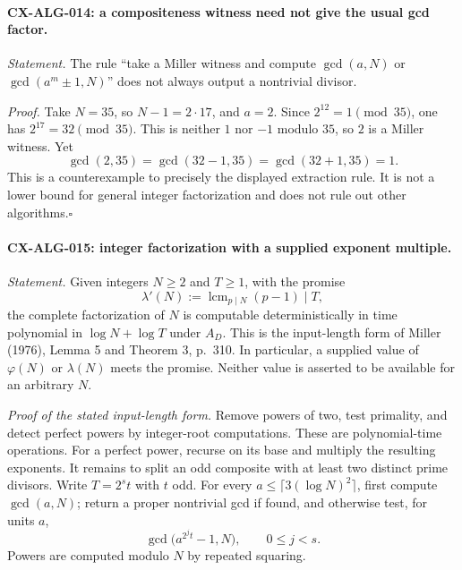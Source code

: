 \documentclass[11pt,a4paper]{article}
\begin{document}
\paragraph{CX-ALG-014: a compositeness witness need not give the usual gcd factor.}
\emph{Statement.} The rule ``take a Miller witness and compute
$\gcd(a,N)$ or $\gcd(a^m\pm1,N)$'' does not always output a nontrivial divisor.

\emph{Proof.} Take $N=35$, so $N-1=2\cdot17$, and $a=2$. Since
$2^{12}=1\pmod{35}$, one has $2^{17}=32\pmod{35}$. This is neither $1$ nor
$-1$ modulo $35$, so $2$ is a Miller witness. Yet
\[
 \gcd(2,35)=\gcd(32-1,35)=\gcd(32+1,35)=1.
\]
This is a counterexample to precisely the displayed extraction rule.
It is not a lower bound for general integer factorization and does not
rule out other algorithms.\hfill$\square$

\paragraph{CX-ALG-015: integer factorization with a supplied exponent multiple.}
\emph{Statement.} Given integers $N\ge2$ and $T\ge1$, with the promise
\[
       \lambda'(N):=\operatorname{lcm}_{p\mid N}(p-1)\mid T,
\]
the complete factorization of $N$ is computable deterministically in time
polynomial in $\log N+\log T$ under $A_D$. This is the input-length form
of Miller (1976), Lemma 5 and Theorem 3, p.~310. In particular, a supplied
value of $\varphi(N)$ or $\lambda(N)$ meets the promise. Neither value is
asserted to be available for an arbitrary $N$.

\emph{Proof of the stated input-length form.} Remove powers of two, test
primality, and detect perfect powers by integer-root computations. These
are polynomial-time operations. For a perfect power, recurse on its base
and multiply the resulting exponents. It remains to split an odd composite
with at least two distinct prime divisors. Write $T=2^s t$ with $t$ odd.
For every $a\leq\lceil3(\log N)^2\rceil$, first compute $\gcd(a,N)$;
return a proper nontrivial gcd if found, and otherwise test, for units $a$,
\[
             \gcd\bigl(a^{2^j t}-1,N\bigr),\qquad 0\leq j<s.
\]
Powers are computed modulo $N$ by repeated squaring.
\end{document}

